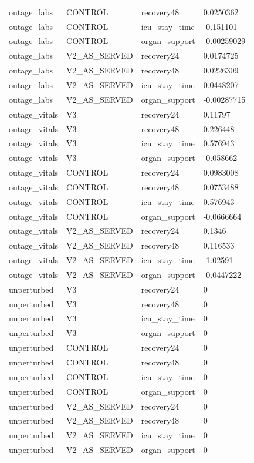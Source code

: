 \begin{tabular}{llll}
outage\_labs & CONTROL & recovery48 & 0.0250362 \\
outage\_labs & CONTROL & icu\_stay\_time & -0.151101 \\
outage\_labs & CONTROL & organ\_support & -0.00259029 \\
outage\_labs & V2\_AS\_SERVED & recovery24 & 0.0174725 \\
outage\_labs & V2\_AS\_SERVED & recovery48 & 0.0226309 \\
outage\_labs & V2\_AS\_SERVED & icu\_stay\_time & 0.0448207 \\
outage\_labs & V2\_AS\_SERVED & organ\_support & -0.00287715 \\
outage\_vitals & V3 & recovery24 & 0.11797 \\
outage\_vitals & V3 & recovery48 & 0.226448 \\
outage\_vitals & V3 & icu\_stay\_time & 0.576943 \\
outage\_vitals & V3 & organ\_support & -0.058662 \\
outage\_vitals & CONTROL & recovery24 & 0.0983008 \\
outage\_vitals & CONTROL & recovery48 & 0.0753488 \\
outage\_vitals & CONTROL & icu\_stay\_time & 0.576943 \\
outage\_vitals & CONTROL & organ\_support & -0.0666664 \\
outage\_vitals & V2\_AS\_SERVED & recovery24 & 0.1346 \\
outage\_vitals & V2\_AS\_SERVED & recovery48 & 0.116533 \\
outage\_vitals & V2\_AS\_SERVED & icu\_stay\_time & -1.02591 \\
outage\_vitals & V2\_AS\_SERVED & organ\_support & -0.0447222 \\
unperturbed & V3 & recovery24 & 0 \\
unperturbed & V3 & recovery48 & 0 \\
unperturbed & V3 & icu\_stay\_time & 0 \\
unperturbed & V3 & organ\_support & 0 \\
unperturbed & CONTROL & recovery24 & 0 \\
unperturbed & CONTROL & recovery48 & 0 \\
unperturbed & CONTROL & icu\_stay\_time & 0 \\
unperturbed & CONTROL & organ\_support & 0 \\
unperturbed & V2\_AS\_SERVED & recovery24 & 0 \\
unperturbed & V2\_AS\_SERVED & recovery48 & 0 \\
unperturbed & V2\_AS\_SERVED & icu\_stay\_time & 0 \\
unperturbed & V2\_AS\_SERVED & organ\_support & 0 \\
\hline
\end{tabular}
